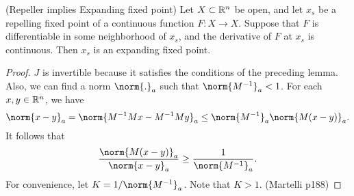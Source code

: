 \documentclass[11pt]{book}
\begin{document}
\begin{proposition}
  (Repeller implies Expanding fixed point)
  Let $X \subset \mathbb{R}^n$ be open, and let $x_s$ be a repelling fixed point
  of a continuous function $F: X \to X$. Suppose that $F$ is
  differentiable in some neighborhood of $x_s$, and the derivative of $F$ at $x_s$ is continuous.
  Then $x_s$ is an expanding fixed point.
\end{proposition}
\begin{proof}
  $J$ is invertible because it satisfies the conditions of the preceding lemma.
  Also, we can find a norm $\norm{.}_a$ such that $\norm{M^{-1}}_a < 1$.
  For each $x, y \in \mathbb{R}^n$, we have 
  \begin{equation*}
    \norm{x-y}_a = \norm{M^{-1} M x - M^{-1} M y}_a \leq \norm{M^{-1}}_a \norm{M(x - y)}_a.
  \end{equation*}
  It follows that 
  \begin{equation*}
    \frac{\norm{M(x-y)}_a}{\norm{x-y}_a} \geq \frac{1}{\norm{M^{-1}}_a}.
  \end{equation*}
  For convenience, let $K = 1/\norm{M^{-1}}_a$.
  Note that $K > 1$.
  (Martelli p188)
\end{proof}

% 
\end{document}
